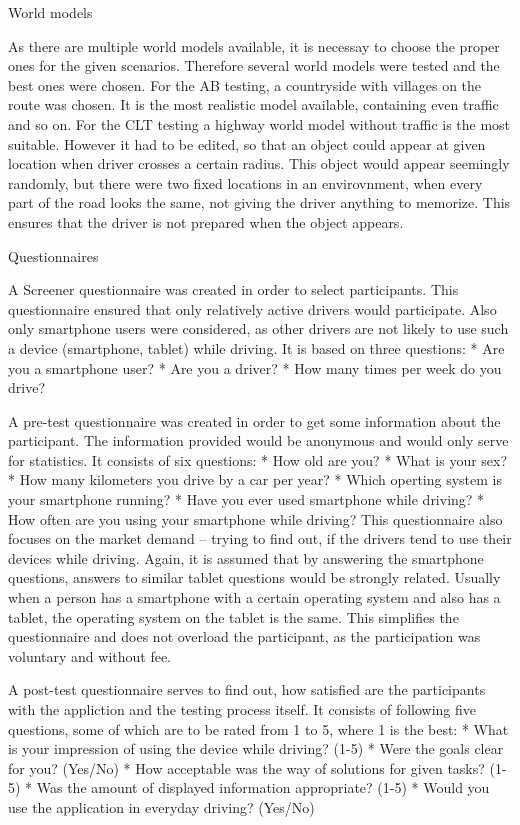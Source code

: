 \seccc World models

As there are multiple world models available, it is necessay to choose the proper ones for the given scenarios. Therefore several world models were tested and the best ones were chosen. For the AB testing, a countryside with villages on the route was chosen. It is the most realistic model available, containing even traffic and so on. For the CLT testing a highway world model without traffic is the most suitable. However it had to be edited, so that an object could appear at given location when driver crosses a certain radius. This object would appear seemingly randomly, but there were two fixed locations in an envirovnment, when every part of the road looks the same, not giving the driver anything to memorize. This ensures that the driver is not prepared when the object appears.

\seccc Questionnaires

A Screener questionnaire was created in order to select participants. This questionnaire ensured that only relatively active drivers would participate. Also only smartphone users were considered, as other drivers are not likely to use such a device (smartphone, tablet) while driving. It is based on three questions:
\begitems
* Are you a smartphone user?
* Are you a driver?
* How many times per week do you drive?
\enditems


A pre-test questionnaire was created in order to get some information about the participant. The information provided would be anonymous and would only serve for statistics. It consists of six questions:
\begitems
* How old are you?
* What is your sex?
* How many kilometers you drive by a car per year?
* Which operting system is your smartphone running?
* Have you ever used smartphone while driving?
* How often are you using your smartphone while driving?
\enditems
This questionnaire also focuses on the market demand -- trying to find out, if the drivers tend to use their devices while driving. Again, it is assumed that by answering the smartphone questions, answers to similar tablet questions would be strongly related. Usually when a person has a smartphone with a certain operating system and also has a tablet, the operating system on the tablet is the same. This simplifies the questionnaire and does not overload the participant, as the participation was voluntary and without fee.

A post-test questionnaire serves to find out, how satisfied are the participants with the appliction and the testing process itself. It consists of following five questions, some of which are to be rated from 1 to 5, where 1 is the best:
\begitems
* What is your impression of using the device while driving? (1-5)
* Were the goals clear for you? (Yes/No)
* How acceptable was the way of solutions for given tasks? (1-5)
* Was the amount of displayed information appropriate? (1-5)
* Would you use the application in everyday driving? (Yes/No)
\enditems

